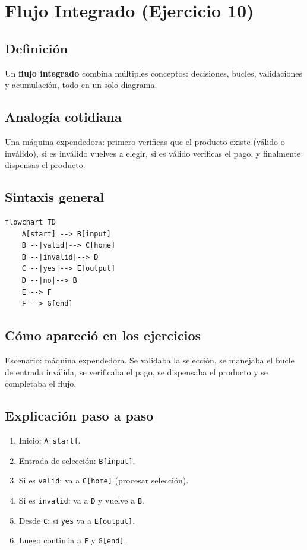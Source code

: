 \documentclass[12pt]{article}
\begin{document}
\newpage

\section{Flujo Integrado (Ejercicio 10)}

\subsection{Definición}

Un \textbf{flujo integrado} combina múltiples conceptos: decisiones, bucles, validaciones y acumulación, todo en un solo diagrama.

\subsection{Analogía cotidiana}

Una máquina expendedora: primero verificas que el producto existe (válido o inválido), si es inválido vuelves a elegir, si es válido verificas el pago, y finalmente dispensas el producto.

\subsection{Sintaxis general}

\begin{lstlisting}[style=mermaidstyle]
flowchart TD
    A[start] --> B[input]
    B --|valid|--> C[home]
    B --|invalid|--> D
    C --|yes|--> E[output]
    D --|no|--> B
    E --> F
    F --> G[end]
\end{lstlisting}

\subsection{Cómo apareció en los ejercicios}

Escenario: máquina expendedora. Se validaba la selección, se manejaba el bucle de entrada inválida, se verificaba el pago, se dispensaba el producto y se completaba el flujo.

\subsection{Explicación paso a paso}

\begin{enumerate}
    \item Inicio: \texttt{A[start]}.
    \item Entrada de selección: \texttt{B[input]}.
    \item Si es \texttt{valid}: va a \texttt{C[home]} (procesar selección).
    \item Si es \texttt{invalid}: va a \texttt{D} y vuelve a \texttt{B}.
    \item Desde \texttt{C}: si \texttt{yes} va a \texttt{E[output]}.
    \item Luego continúa a \texttt{F} y \texttt{G[end]}.
\end{enumerate}
\end{document}

